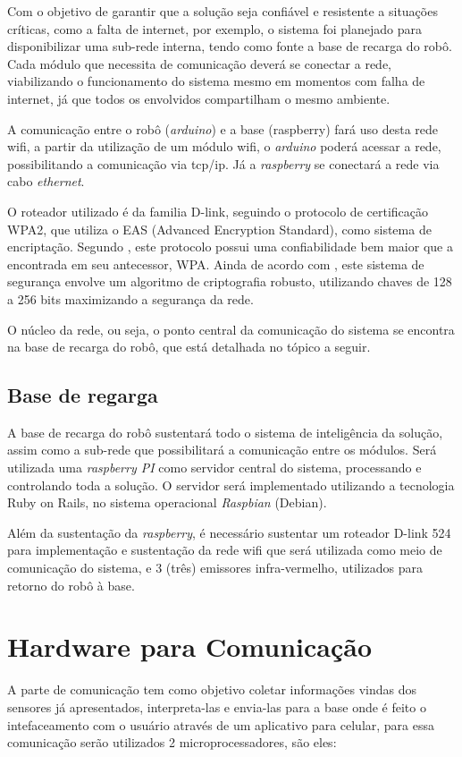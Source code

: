 	Com o objetivo de garantir que a solução seja confiável e resistente a situações críticas, como a falta de internet, por exemplo, o sistema foi planejado para disponibilizar uma sub-rede interna, tendo como fonte a base de recarga do robô. Cada módulo que necessita de comunicação deverá se conectar a rede, viabilizando o funcionamento do sistema mesmo em momentos com falha de internet, já que todos os envolvidos compartilham o mesmo ambiente.

	A comunicação entre o robô (\textit{arduino}) e a base (raspberry) fará uso desta rede wifi, a partir da utilização de um módulo wifi, o \textit{arduino} poderá acessar a rede, possibilitando a comunicação via tcp/ip. Já a \textit{raspberry} se conectará a rede via cabo \textit{ethernet}.

	O roteador utilizado é da familia D-link, seguindo o protocolo de certificação WPA2, que utiliza o EAS (Advanced Encryption Standard), como sistema de encriptação. Segundo \cite{wpa2}, este protocolo possui uma confiabilidade bem maior que a encontrada em seu antecessor, WPA. Ainda de acordo com \cite{wpa2}, este sistema de segurança envolve um algoritmo de criptografia robusto, utilizando chaves de 128 a 256 bits maximizando a segurança da rede.


	O núcleo da rede, ou seja, o ponto central da comunicação do sistema se encontra na base de recarga do robô, que está detalhada no tópico a seguir.

	\subsection{Base de regarga}

	A base de recarga do robô sustentará todo o sistema de inteligência da solução, assim como a sub-rede que possibilitará a comunicação entre os módulos. Será utilizada uma \textit{raspberry PI} como servidor central do sistema, processando e controlando toda a solução. O servidor será implementado utilizando a tecnologia Ruby on Rails, no sistema operacional \textit{Raspbian} (Debian).

	Além da sustentação da \textit{raspberry}, é necessário sustentar um roteador D-link 524 para implementação e sustentação da rede wifi que será utilizada como meio de comunicação do sistema, e 3 (três) emissores infra-vermelho, utilizados para retorno do robô à base.
	

\section{Hardware para Comunicação}
\label{sub:Hardwar_para_Comunicação}
  A parte de comunicação tem como objetivo coletar informações vindas dos sensores já apresentados, interpreta-las e envia-las para a base onde é feito o intefaceamento com o usuário através de um aplicativo para celular, para essa comunicação serão utilizados 2 microprocessadores, são eles:

